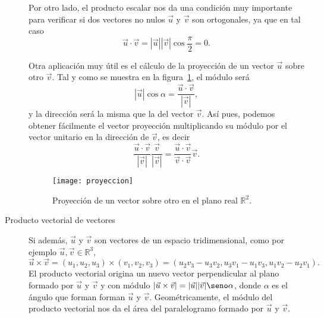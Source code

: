 \documentclass[a4paper]{article}
\begin{document}
\begin{description}
Por otro lado, el producto escalar nos da una condición muy importante para
verificar si dos vectores no nulos $\vec{u}$ y $\vec{v}$ son ortogonales, ya
que en tal caso
\[
\vec{u}\cdot\vec{v}=|\vec{u}||\vec{v}|\cos \frac{\pi}{2}=0.\]

Otra aplicación muy útil es el cálculo de la proyección de un
vector $\vec{u}$ sobre otro $\vec{v}$. Tal y como se muestra en la figura~\ref{g:proyeccion}, el
módulo será
\[|\vec{u}|\cos\alpha=\frac{\vec{u}\cdot\vec{v}}{|\vec{v}|},
\]
y la dirección será la misma que la del vector $\vec{v}$. Así pues, podemos
obtener fácilmente el vector proyección multiplicando su módulo por el vector
unitario en la dirección de $\vec{v}$, es decir
\[
\frac{\vec{u}\cdot\vec{v}}{|\vec{v}|}\frac{\vec{v}}{|\vec{v}|}=
\frac{\vec{u}\cdot\vec{v}}{\vec{v}\cdot\vec{v}}\vec{v}.
\]

\begin{figure}[h!]
\begin{center}
\texttt{[image: proyeccion]}
\caption{Proyección de un vector sobre otro en el plano real $\mathbb{R}^2$.}
\label{g:proyeccion}
\end{center}
\end{figure}

\item [Producto vectorial de vectores] Si además, $\vec{u}$ y $\vec{v}$ son vectores
de un espacio tridimensional, como por ejemplo $\vec{u},\vec{v}\in \mathbb{R}^3$,
\[
\vec{u}\times\vec{v}=(u_1,u_2,u_3)\times(v_1,v_2,v_3)=(u_2v_3-u_3v_2,u_3v_1-u_1v_3,u_1v_2-u_2v_1).
\]
El producto vectorial origina un nuevo vector perpendicular al plano formado
por $\vec{u}$ y $\vec{v}$ y con módulo
$|\vec{u}\times\vec{v}|=|\vec{u}||\vec{v}|\seno \alpha$, donde $\alpha$ es el
ángulo que forman forman $\vec{u}$ y $\vec{v}$. Geométricamente, el módulo del
producto vectorial nos da el área del paralelogramo formado por $\vec{u}$ y
$\vec{v}$.

\end{description}
\end{document}
